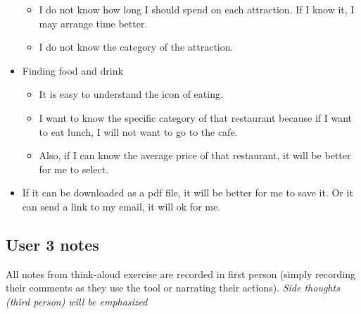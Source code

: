 \begin{itemize}
\begin{itemize}
  \item I do not know how long I should spend on each attraction. If I know it, I may arrange time better.
  \item I do not know the category of the attraction.
  \end{itemize}
\item Finding food and drink
  \begin{itemize}
  \item It is easy to understand the icon of eating.
  \item I want to know the specific category of that restaurant because if I want to eat lunch, I will not want to go to the cafe.
  \item Also, if I can know the average price of that restaurant, it will be better for me to select.
  \end{itemize}
\item If it can be downloaded as a pdf file, it will be better for me to save it. Or it can send a link to my email, it will ok for me.
\end{itemize}

\subsection{User 3 notes}
All notes from think-aloud exercise are recorded in first person (simply recording their comments as they use the tool or narrating their actions). \textit{Side thoughts (third person) will be emphasized}

